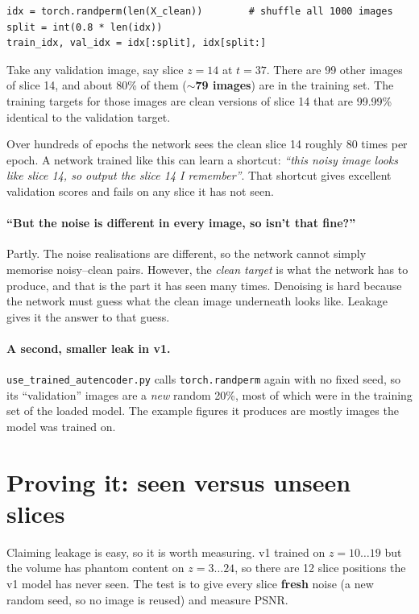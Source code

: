 \documentclass[11pt,a4paper]{article}
\begin{document}
\begin{lstlisting}
idx = torch.randperm(len(X_clean))        # shuffle all 1000 images
split = int(0.8 * len(idx))
train_idx, val_idx = idx[:split], idx[split:]
\end{lstlisting}

Take any validation image, say slice $z=14$ at $t=37$. There are 99 other images of slice 14, and about 80\%
of them (\textbf{$\sim$79 images}) are in the training set. The training targets for those images are clean
versions of slice 14 that are 99.99\% identical to the validation target.

Over hundreds of epochs the network sees the clean slice 14 roughly 80 times per epoch. A network trained like
this can learn a shortcut: \emph{``this noisy image looks like slice 14, so output the slice 14 I remember''}.
That shortcut gives excellent validation scores and fails on any slice it has not seen.

\paragraph{``But the noise is different in every image, so isn't that fine?''}
Partly. The noise realisations are different, so the network cannot simply memorise noisy--clean pairs.
However, the \emph{clean target} is what the network has to produce, and that is the part it has seen
many times. Denoising is hard because the network must guess what the clean image underneath looks like.
Leakage gives it the answer to that guess.

\paragraph{A second, smaller leak in v1.}
\texttt{use\_trained\_autencoder.py} calls \texttt{torch.randperm} again with no fixed seed, so its
``validation'' images are a \emph{new} random 20\%, most of which were in the training set of the loaded model.
The example figures it produces are mostly images the model was trained on.

\section{Proving it: seen versus unseen slices}

Claiming leakage is easy, so it is worth measuring. v1 trained on $z=10\ldots19$ but the volume has phantom
content on $z=3\ldots24$, so there are 12 slice positions the v1 model has never seen. The test is to give
every slice \textbf{fresh} noise (a new random seed, so no image is reused) and measure PSNR.
\end{document}
